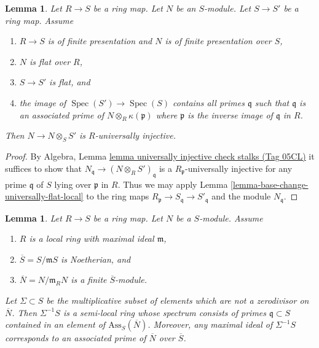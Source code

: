 \documentclass{amsart}
\theoremstyle{plain}
\newtheorem{lemma}[subsection]{Lemma}
\theoremstyle{definition}
\theoremstyle{remark}
\numberwithin{equation}{subsection}
\def\Spec{\mathop{\mathrm{Spec}}}
\begin{document}
\begin{lemma}
\label{lemma-base-change-universally-flat}
Let $R \to S$ be a ring map.
Let $N$ be an $S$-module.
Let $S \to S'$ be a ring map.
Assume
\begin{enumerate}
\item $R \to S$ is of finite presentation and $N$ is of finite presentation
over $S$,
\item $N$ is flat over $R$,
\item $S \to S'$ is flat, and
\item the image of $\Spec(S') \to \Spec(S)$ contains
all primes $\mathfrak q$ such that $\mathfrak q$ is an associated prime
of $N \otimes_R \kappa(\mathfrak p)$ where $\mathfrak p$ is the inverse
image of $\mathfrak q$ in $R$.
\end{enumerate}
Then $N \to N \otimes_S S'$ is $R$-universally injective.
\end{lemma}

\begin{proof}
By
Algebra, Lemma \href{https://stacks.math.columbia.edu/tag/05CL}{lemma universally injective check stalks (Tag 05CL)}
it suffices to show that $N_{\mathfrak q} \to (N \otimes_R S')_{\mathfrak q}$
is a $R_{\mathfrak p}$-universally injective for any prime $\mathfrak q$
of $S$ lying over $\mathfrak p$ in $R$. Thus we may apply
Lemma \ref{lemma-base-change-universally-flat-local}
to the ring maps
$R_{\mathfrak p} \to S_{\mathfrak q} \to S'_{\mathfrak q}$
and the module $N_{\mathfrak q}$.
\end{proof}


\begin{lemma}
\label{lemma-homothety-spectrum}
Let $R \to S$ be a ring map.
Let $N$ be a $S$-module.
Assume
\begin{enumerate}
\item $R$ is a local ring with maximal ideal $\mathfrak m$,
\item $\overline{S} = S/\mathfrak m S$ is Noetherian, and
\item $\overline{N} = N/\mathfrak m_R N$ is a finite $\overline{S}$-module.
\end{enumerate}
Let $\Sigma \subset S$ be the multiplicative subset of elements which are not
a zerodivisor on $\overline{N}$. Then $\Sigma^{-1}S$ is a semi-local ring
whose spectrum consists of primes $\mathfrak q \subset S$ contained in an
element of $\text{Ass}_S(\overline{N})$. Moreover, any maximal
ideal of $\Sigma^{-1}S$ corresponds to an associated prime of
$\overline{N}$ over $\overline{S}$.
\end{lemma}
\end{document}
